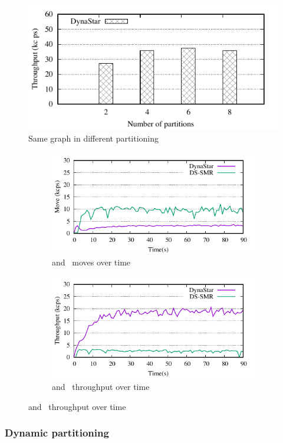 \begin{figure}[ht]
	\includegraphics{figures/experiments/throughput-avg-vary-partition}
	\caption{Same graph in different partitioning}
	\label{fig:4p1p_varying_partition_size}
\end{figure}

\begin{figure}
\centering
\begin{subfigure}[ht]{0.5\textwidth}
\captionsetup{justification=centering}
	\includegraphics{figures/experiments/move-dynastar-vs-dssmr-4p}
	\caption{\dynastar and \dssmr\ moves over time}
	\label{fig:4p_moves}
\end{subfigure}

\begin{subfigure}[ht]{0.5\textwidth}
	\includegraphics{figures/experiments/tp-dynastar-vs-dssmr-4p}
	\caption{\dynastar and \dssmr\ throughput over time}
	\label{fig:4p_tput}
\end{subfigure}
\end{figure}

\subsubsection{Dynamic partitioning}




\label{sec:evaluation:strongloc}

